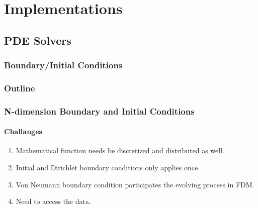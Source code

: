 

































































\section{Implementations}
\subsection{PDE Solvers}

\subsubsection{Boundary/Initial Conditions}
\begin{frame}
  \frametitle{Outline}
    \begingroup
    \setcounter{tocdepth}{3}
    \tableofcontents[currentsection, sectionstyle=show/hide, subsectionstyle=show/shaded, subsubsectionstyle=show/shaded, hideothersubsections]
    \endgroup
\end{frame}

\begin{frame}
  \frametitle{N-dimension Boundary and Initial Conditions}
  \framesubtitle{Challanges}
  \begin{enumerate}
    \item Mathematical function needs be discretized and distributed as well.
    \item Initial and Dirichlet boundary conditions only applies once.
    \item Von Neumann boundary condition participates the evolving process in FDM.
    \item Need to access the data.
  \end{enumerate}
\end{frame}


